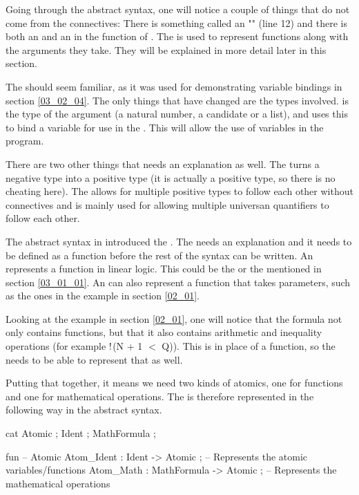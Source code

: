 Going through the abstract syntax, one will notice a couple of things that do not come from the connectives: There is something called an "" (line 12) and there is both an  and an  in the function of . The  is used to represent functions along with the arguments they take. They will be explained in more detail later in this section.

The  should seem familiar, as it was used for demonstrating variable bindings in section \ref{03_02_04}. The only things that have changed are the types involved.  is the type of the argument (a natural number, a candidate or a list), and  uses this  to bind a variable for use in the . This will allow the use of variables in the program.

There are two other things that needs an explanation as well. The  turns a negative type into a positive type (it is actually a positive type, so there is no cheating here). The  allows for multiple positive types to follow each other without connectives and is mainly used for allowing multiple universan quantifiers to follow each other.

The abstract syntax in  introduced the . The  needs an explanation and it needs to be defined as a function before the rest of the syntax can be written. An  represents a function in linear logic. This could be the  or the  mentioned in section \ref{03_01_01}. An  can also represent a function that takes parameters, such as the ones in the example in section \ref{02_01}.

Looking at the example in section \ref{02_01}, one will notice that the formula not only contains functions, but that it also contains arithmetic and inequality operations (for example  $\mathord{\text{\rm !}}$(N + 1 $<$ Q)). This is in place of a function, so the  needs to be able to represent that as well.

Putting that together, it means we need two kinds of atomics, one for functions and one for mathematical operations. The  is therefore represented in the following way in the abstract syntax.

\begin{lstgf}
    cat
        Atomic ; Ident ; MathFormula ;

    fun
        -- Atomic
        Atom_Ident : Ident -> Atomic ;          -- Represents the atomic variables/functions
        Atom_Math : MathFormula -> Atomic ;     -- Represents the mathematical operations
\end{lstgf}

